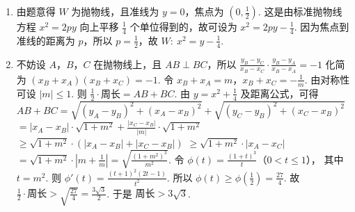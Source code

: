\begin{solution}
\begin{enumerate}
\item 由题意得 \(W\) 为抛物线，且准线为 \(y=0\)，焦点为 \(\left(0,\frac12\right)\). 这是由标准抛物线方程 \(x^2=2py\) 向上平移 \(\frac14\) 个单位得到的，故可设为
\(x^2=2py-\frac14\).
因为焦点到准线的距离为 \(p\)，所以 \(p=\frac12\)，故
\(W:\ x^2=y-\frac14\).

\item 不妨设 \(A\)，\(B\)，\(C\) 在抛物线上，且 \(AB\perp BC\)，所以
\(\frac{y_B-y_C}{x_B-x_C}\cdot \frac{y_B-y_A}{x_B-x_A}=-1\)
化简为
\((x_B+x_A)(x_B+x_C)=-1\).
令
\(x_B+x_A=m\)，\(x_B+x_C=-\frac1m\).
由对称性可设 \(|m|\le 1\). 则
\(\frac12\cdot \text{周长}=AB+BC\).
由
\(y=x^2+\frac14\)
及距离公式，可得
\(AB+BC=\sqrt{(y_A-y_B)^2+(x_A-x_B)^2}+\sqrt{(y_C-y_B)^2+(x_C-x_B)^2}\)
\(=|x_A-x_B|\cdot\sqrt{1+m^2}+\frac{|x_C-x_B|}{|m|}\cdot\sqrt{1+m^2}\)
\(\ge \sqrt{1+m^2}\cdot\left(|x_A-x_B|+|x_C-x_B|\right)\)
\(\ge \sqrt{1+m^2}\cdot|x_A-x_C|\)
\(=\sqrt{1+m^2}\cdot\left|m+\frac1m\right| =\sqrt{\frac{(1+m^2)^3}{m^2}}\).
令
\(\phi(t)=\frac{(1+t)^3}{t}\)（\(0<t\le 1\)），
其中 \(t=m^2\). 则
\(\phi'(t)=\frac{(t+1)^2(2t-1)}{t^2}\).
所以 \(\phi(t)\ge \phi\left(\frac12\right)=\frac{27}{4}\). 故
\(\frac12\cdot \text{周长}> \sqrt{\frac{27}{4}}=\frac{3\sqrt3}{2}\).
于是
\(\text{周长}>3\sqrt3\).
\end{enumerate}
\end{solution}
